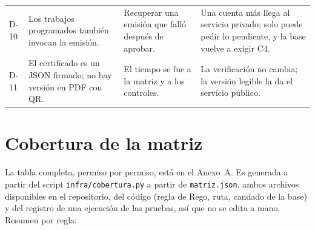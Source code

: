 \documentclass[11pt,letterpaper]{article}
\newcommand{\cod}[1]{\texttt{\small #1}}
\newcommand{\arch}[1]{\texttt{\small #1}}
\begin{document}
\begin{center}
\begin{longtable}{@{}L{0.8cm} L{4.2cm} L{4.6cm} p{5.0cm}@{}}
D-10 & Los trabajos programados también invocan la emisión. & Recuperar una emisión que falló después de aprobar. & Una cuenta más llega al servicio privado; solo puede pedir lo pendiente, y la base vuelve a exigir C4. \\
D-11 & El certificado es un JSON firmado; no hay versión en PDF con QR. & El tiempo se fue a la matriz y a los controles. & La verificación no cambia; la versión legible la da el servicio público. \\
\bottomrule
\end{longtable}
\end{center}

\section{Cobertura de la matriz}

La tabla completa, permiso por permiso, está en el Anexo~A. Es generada a partir del script \arch{infra/cobertura.py} a partir de \cod{matriz.json}, ambos archivos disponibles en el repositorio, del código (regla de Rego, ruta, candado de la base) y del registro de una ejecución de las pruebas, así que no se edita a mano. Resumen por regla:
\end{document}
